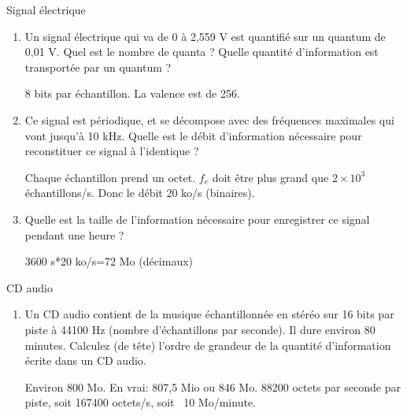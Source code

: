 \begin{exercice}
  \begin{exercicelet}{Signal électrique}
    \begin{enumerate}
    \item Un signal électrique qui va de 0 à 2,559 V est quantifié sur un quantum
      de 0,01 V. Quel est le nombre de quanta ? Quelle quantité d'information
      est transportée par un quantum ?
      \begin{xcorrection}
        8 bits par échantillon. La valence est de 256.
      \end{xcorrection}
    \item Ce signal est périodique, et se décompose avec des fréquences
      maximales qui vont jusqu'à 10 kHz. Quelle est le débit d'information
      nécessaire pour reconstituer ce signal à l'identique ?
      \begin{xcorrection}
        Chaque échantillon prend un octet. $f_e$ doit être plus grand que
        $2\times 10^3$ échantillons/s. Donc le débit 20 ko/s (binaires).
      \end{xcorrection}
    \item Quelle est la taille de l'information nécessaire pour enregistrer ce
      signal pendant une heure ?
      \begin{xcorrection}
        3600 s*20 ko/s=72 Mo (décimaux)
      \end{xcorrection}
    \end{enumerate}
  \end{exercicelet}
  \begin{exercicelet}{CD audio}
    \begin{enumerate}
    \item Un CD audio contient de la musique échantillonnée en stéréo sur 16
      bits par piste à 44100 Hz (nombre d'échantillons par seconde). Il dure
      environ 80 minutes. Calculez (de tête) l'ordre de grandeur de la
      quantité d'information écrite dans un CD audio.
      \begin{xcorrection}
        Environ 800 Mo. En vrai: 807,5 Mio ou 846 Mo.  88200 octets par
        seconde par piste, soit 167400 octets/s, soit ~10 Mo/minute.
      \end{xcorrection}
    \end{enumerate}
  \end{exercicelet}
\end{exercice}


